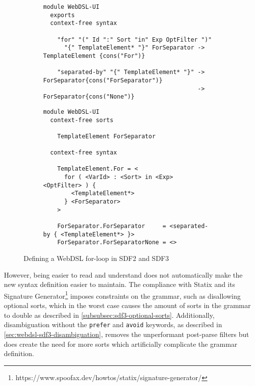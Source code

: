     \begin{figure}
      \begin{subfigure}[b]{1\textwidth}
        \begin{verbatim}
module WebDSL-UI
  exports
  context-free syntax

    "for" "(" Id ":" Sort "in" Exp OptFilter ")"
      "{" TemplateElement* "}" ForSeparator -> TemplateElement {cons("For")}

    "separated-by" "{" TemplateElement* "}" -> ForSeparator{cons("ForSeparator")}
                                            -> ForSeparator{cons("None")}
        \end{verbatim}
        \caption{\label{fig:sdf3-maintainability-1-sdf2}}
      \end{subfigure}
      \begin{subfigure}[b]{1\textwidth}
        \begin{verbatim}
module WebDSL-UI
  context-free sorts

    TemplateElement ForSeparator

  context-free syntax

    TemplateElement.For = <
      for ( <VarId> : <Sort> in <Exp> <OptFilter> ) {
        <TemplateElement*>
      } <ForSeparator>
    >

    ForSeparator.ForSeparator     = <separated-by { <TemplateElement*> }>
    ForSeparator.ForSeparatorNone = <>
        \end{verbatim}
        \caption{\label{fig:sdf3-maintainability-1-sdf3}}
      \end{subfigure}
      \caption{\label{fig:sdf3-maintainability-1}Defining a WebDSL for-loop in SDF2 and SDF3}
    \end{figure}

    However, being easier to read and understand does not automatically make the new syntax definition easier to maintain. The compliance with Statix and its Signature Generator\footnote{https://www.spoofax.dev/howtos/statix/signature-generator/} imposes constraints on the grammar, such as disallowing optional sorts, which in the worst case causes the amount of sorts in the grammar to double as described in \cref{subsubsec:sdf3-optional-sorts}. Additionally, disambiguation without the \texttt{prefer} and \texttt{avoid} keywords, as described in \cref{sec:webdsl-sdf3-disambiguation}, removes the unperformant post-parse filters but does create the need for more sorts which artificially complicate the grammar definition.

